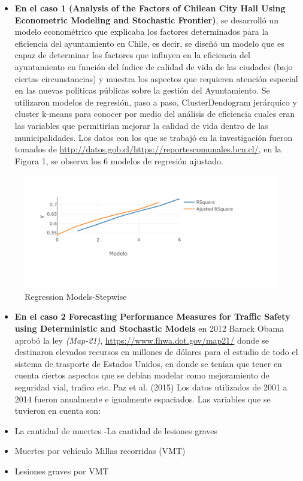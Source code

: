 \documentclass[
  british,
]{article}
\providecommand{\tightlist}{%
  \setlength{\itemsep}{0pt}\setlength{\parskip}{0pt}}
\begin{document}
\begin{itemize}
\tightlist
\item
  \textbf{En el caso 1 (Analysis of the Factors of Chilean City Hall
  Using Econometric Modeling and Stochastic Frontier)}, se desarrolló un
  modelo econométrico que explicaba los factores determinados para la
  eficiencia del ayuntamiento en Chile, es decir, se diseñó un modelo
  que es capaz de determinar los factores que influyen en la eficiencia
  del ayuntamiento en función del índice de calidad de vida de las
  ciudades (bajo ciertas circunstancias) y muestra los aspectos que
  requieren atención especial en las nuevas políticas públicas sobre la
  gestión del Ayuntamiento. Se utilizaron modelos de regresión, paso a
  paso, ClusterDendogram jerárquico y cluster k-means para conocer por
  medio del análisis de eficiencia cuales eran las variables que
  permitirían mejorar la calidad de vida dentro de las municipalidades.
  Los datos con los que se trabajó en la investigación fueron tomados de
  \url{http://datos.gob.cl/https://reportescomunales.bcn.cl/}, en la
  Figura 1, se observa los 6 modelos de regresión ajustado.
\end{itemize}

\begin{figure}[htbp]
\centering
\includegraphics{caso1}
\caption{Regression Models-Stepwise}
\end{figure}

\begin{itemize}
\tightlist
\item
  \textbf{En el caso 2 Forecasting Performance Measures for Traffic
  Safety using Deterministic and Stochastic Models} en 2012 Barack Obama
  aprobó la ley \emph{(Map-21)}, \url{https://www.fhwa.dot.gov/map21/}
  donde se destinaron elevados recursos en millones de dólares para el
  estudio de todo el sistema de trasporte de Estados Unidos, en donde se
  tenían que tener en cuenta ciertos aspectos que se debían modelar como
  mejoramiento de seguridad vial, trafico etc. Paz et al. (2015) Los
  datos utilizados de 2001 a 2014 fueron anualmente e igualmente
  espaciados. Las variables que se tuvieron en cuenta son:
\item
  La cantidad de muertes -La cantidad de lesiones graves
\item
  Muertes por vehículo Millas recorridas (VMT)
\item
  Lesiones graves por VMT
\end{itemize}
\end{document}
